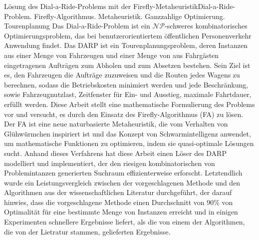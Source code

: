 \documentclass[tuberlin,cic,tc,openright,english,noabntcite,oneside]{iiufrgs}
\begin{document}
\begin{englishabstract}{Lösung des Dial-a-Ride-Problems mit der Firefly-Metaheuristik}{Dial-a-Ride-Problem. Firefly-Algorithmus. Metaheuristik. Ganzzahlige Optimierung. Tourenplanung}
Das Dial-a-Ride-Problem ist ein $\mathcal{NP}$-schweres kombinatorisches Optimierungsproblem, das bei benutzerorientiertem öffentlichen Personenverkehr Anwendung findet. Das DARP ist ein Tourenplanungsproblem, deren Instanzen aus einer Menge von Fahrzeugen und einer Menge von aus Fahrgästen eingetragenen Aufträgen zum Abholen und zum Absetzen bestehen. Sein Ziel ist es, den Fahrzeugen die Aufträge zuzuweisen und die Routen jedes Wagens zu berechnen, sodass die Betriebskosten minimiert werden und jede Beschränkung, sowie Fahrzeugnutzlast, Zeitfenster für Ein- und Ausstieg, maximale Fahrtdauer, erfüllt werden. Diese Arbeit stellt eine mathematische Formulierung des Problems vor und versucht, es durch den Einsatz des Firefly-Algorithmus (FA) zu lösen. Der FA ist eine neue naturbasierte Metaheuristik, die vom Verhalten von Glühwürmchen inspiriert ist und das Konzept von Schwarmintelligenz anwendet, um mathematische Funktionen zu optimieren, indem sie quasi-optimale Lösungen sucht. Anhand dieses Verfahrens hat diese Arbeit einen Löser des DARP modelliert und implementiert, der den riesigen kombinatorischen von Problemintanzen generierten Suchraum effizienterweise erforscht. Letztendlich wurde ein Leistungsvergleich zwischen der vorgeschlagenen Methode und den Algorithmen aus der wissenschaftlichen Literatur durchgeführt, der darauf hinwies, dass die vorgeschlagene Methode einen Durchschnitt von 90\% von Optimalität für eine bestimmte Menge von Instanzen erreicht und in einigen Experimenten schnellere Ergebnisse liefert, als die von einem der Algorithmen, die von der Lietratur stammen, gelieferten Ergebnisse.
\end{englishabstract}

\listoffigures

\listoftables
\end{document}
